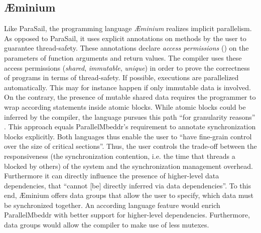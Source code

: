 \subsection{\AE minium}
Like ParaSail, the programming language \textit{\AE minium} realizes implicit parallelism. As opposed to ParaSail, it uses explicit annotations on methods by the user to guarantee thread-safety. These annotations declare \textit{access permissions} (\cite{ModularTypestateChecking}) on the parameters of function arguments and return values. The compiler uses these access permissions (\textit{shared}, \textit{immutable}, \textit{unique}) in order to prove the correctness of programs in terms of thread-safety. If possible, executions are parallelized automatically. This may for instance happen if only immutable data is involved. On the contrary, the presence of mutable shared data requires the programmer to wrap according statements inside atomic blocks. While atomic blocks could be inferred by the compiler, the language pursues this path ``for granularity reasons'' \cite{ConcurrencyByDefault}. This approach equals ParallelMbeddr's requirement to annotate synchronization blocks explicitly. Both languages thus enable the user to ``have fine-grain control over the size of critical sections''. Thus, the user controls the trade-off between the responsiveness (the synchronization contention, i.e. the time that threads a blocked by others) of the system and the synchronization management overhead. Furthermore it can directly influence the presence of higher-level data dependencies, that
``cannot [be] directly inferred via data dependencies''. To this end, \AE minium offers data groups that allow the user to specify, which data must be synchronized together. An according language feature would enrich ParallelMbeddr with better support for higher-level dependencies. Furthermore, data groups would allow the compiler to make use of less mutexes.

